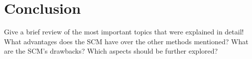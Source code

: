 %
\chapter{Conclusion}
\label{chapter:conclusion}
%

Give a brief review of the most important topics that were explained in detail!
What advantages does the SCM have over the other methods mentioned?
What are the SCM's drawbacks?
Which aspects should be further explored?